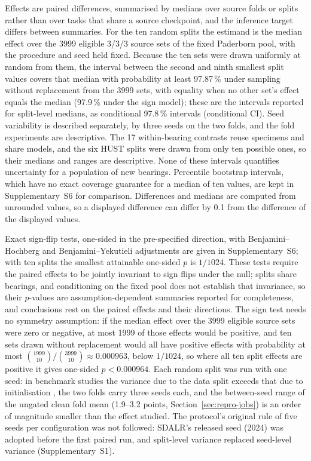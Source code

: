 Effects are paired differences, summarised by medians over source folds or splits rather than over tasks that share a source checkpoint, and the inference target differs between summaries. For the ten random splits the estimand is the median effect over the 3999 eligible 3/3/3 source sets of the fixed Paderborn pool, with the procedure and seed held fixed. Because the ten sets were drawn uniformly at random from them, the interval between the second and ninth smallest split values covers that median with probability at least 97.87\,\% under sampling without replacement from the 3999 sets, with equality when no other set's effect equals the median (97.9\,\% under the sign model); these are the intervals reported for split-level medians, as conditional 97.8\,\% intervals (conditional CI). Seed variability is described separately, by three seeds on the two folds, and the fold experiments are descriptive. The 17 within-bearing contrasts reuse specimens and share models, and the six HUST splits were drawn from only ten possible ones, so their medians and ranges are descriptive. None of these intervals quantifies uncertainty for a population of new bearings. Percentile bootstrap intervals, which have no exact coverage guarantee for a median of ten values, are kept in Supplementary~S6 for comparison. Differences and medians are computed from unrounded values, so a displayed difference can differ by 0.1 from the difference of the displayed values.

Exact sign-flip tests, one-sided in the pre-specified direction, with Benjamini--Hochberg and Benjamini--Yekutieli adjustments \cite{benjamini1995,benjamini2001} are given in Supplementary~S6; with ten splits the smallest attainable one-sided $p$ is $1/1024$. These tests require the paired effects to be jointly invariant to sign flips under the null; splits share bearings, and conditioning on the fixed pool does not establish that invariance, so their $p$-values are assumption-dependent summaries reported for completeness, and conclusions rest on the paired effects and their directions. The sign test needs no symmetry assumption: if the median effect over the 3999 eligible source sets were zero or negative, at most 1999 of those effects would be positive, and ten sets drawn without replacement would all have positive effects with probability at most $\binom{1999}{10}/\binom{3999}{10} \approx 0.000963$, below $1/1024$, so where all ten split effects are positive it gives one-sided $p < 0.000964$. Each random split was run with one seed: in benchmark studies the variance due to the data split exceeds that due to initialisation \cite{bouthillier2021}, the two folds carry three seeds each, and the between-seed range of the ungated clean fold mean (1.9--3.2 points, Section~\ref{sec:repro-jobs}) is an order of magnitude smaller than the effect studied. The protocol's original rule of five seeds per configuration was not followed: SDALR's released seed (2024) was adopted before the first paired run, and split-level variance replaced seed-level variance (Supplementary~S1).

